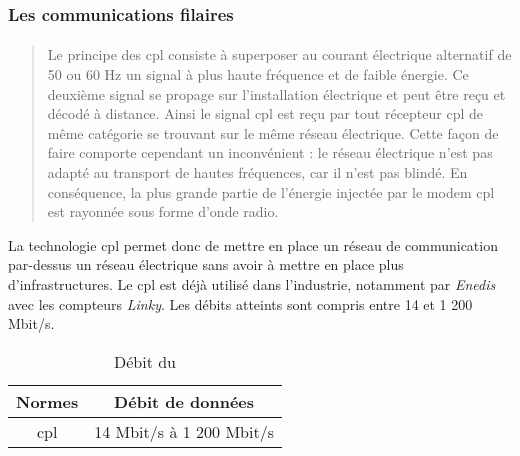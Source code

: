 \subsubsection{Les communications filaires}
\label{sec:communicationFilaire}

\paragraph{}
\label{sec:cpl}

\blockquote{Le principe des \gls{cpl} consiste à superposer au courant électrique alternatif de 50 ou 60 Hz
    un signal à plus haute fréquence et de faible énergie. Ce deuxième signal se propage sur l’installation
    électrique et peut être reçu et décodé à distance. Ainsi le signal \gls{cpl} est reçu par tout récepteur
    \gls{cpl} de même catégorie se trouvant sur le même réseau électrique. Cette façon de faire comporte cependant un
    inconvénient : le réseau électrique n'est pas adapté au transport de hautes fréquences, car il n'est pas blindé.
    En conséquence, la plus grande partie de l'énergie injectée par le modem \gls{cpl} est rayonnée sous forme
    d'onde radio.}{\cite{cpl}}

La technologie \gls{cpl} permet donc de mettre en place un réseau de communication par-dessus un réseau électrique sans
avoir à mettre en place plus d'infrastructures. Le \gls{cpl} est déjà utilisé dans l'industrie, notamment par \textit{Enedis}
avec les compteurs \textit{Linky}. Les débits atteints sont compris entre 14 et 1 200 Mbit/s.

\begin{table}[ht!]
    \centering
    \begin{tabular}{|c|c|}
        \hline
        \rowcolor{tableColorDark} Normes & Débit de données         \\
        \hline

        \gls{cpl}                        & 14 Mbit/s à 1 200 Mbit/s \\\hline
    \end{tabular}
    \label{tab:debitCPL}
    \caption{Débit du }
    \nocite{cpl}
\end{table}

\paragraph{}
\label{sec:ethernet}

